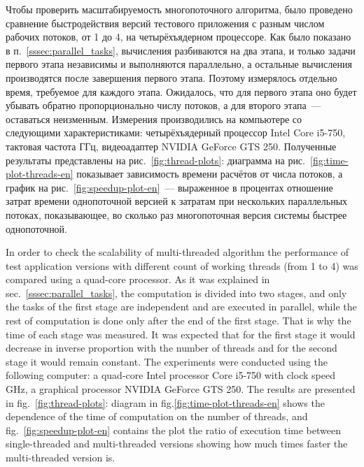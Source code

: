 \documentclass[a4paper, 12pt, titlepage]{extarticle}
\newcommand{\num}[1]{\numprint{#1}}
\begin{document}
\begin{original}
        Чтобы проверить масштабируемость многопоточного алгоритма, было проведено сравнение быстродействия
        версий тестового приложения с разным числом рабочих потоков, от 1 до 4, на четырёхъядерном
        процессоре. Как было показано в п.~\ref{sssec:parallel_tasks}, вычисления разбиваются на два
        этапа, и только задачи первого этапа независимы и выполняются параллельно, а остальные
        вычисления производятся после завершения первого этапа. Поэтому измерялось отдельно время,
        требуемое для каждого этапа. Ожидалось, что для первого этапа оно будет убывать обратно
        пропорционально числу потоков, а для второго этапа~--- оставаться неизменным.
        Измерения производились на компьютере со следующими характеристиками: четырёхъядерный
        процессор Intel Core i5-750, тактовая частота \num{2.66} ГГц, видеоадаптер NVIDIA GeForce GTS 250.
        Полученные результаты представлены на рис.~\ref{fig:thread-plots}: диаграмма на
        рис.~\ref{fig:time-plot-threads-en} показывает зависимость времени расчётов от числа потоков, а
        график на рис.~\ref{fig:speedup-plot-en}~--- выраженное в процентах отношение затрат времени
        однопоточной версией к затратам при нескольких параллельных потоках, показывающее, во сколько раз
        многопоточная версия системы быстрее однопоточной.
\end{original}

        In order to check the scalability of multi-threaded algorithm the performance of test
        application versions with different count of working threads (from 1 to 4) was compared
        using a quad-core processor. As it was explained in sec.~\ref{sssec:parallel_tasks}, the
        computation is divided into two stages, and only the tasks of the first stage are
        independent and are executed in parallel, while the rest of computation is done only after
        the end of the first stage. That is why the time of each stage was measured. It was expected
        that for the first stage it would decrease in inverse proportion with the number of threads
        and for the second stage it would remain constant. The experiments were conducted using the
        following computer: a quad-core Intel processor Core i5-750 with clock speed \num{2.66} GHz,
        a graphical processor NVIDIA GeForce GTS 250. The results are presented in
        fig.~\ref{fig:thread-plots}: diagram in fig.\ref{fig:time-plot-threads-en} shows the dependence
        of the time of computation on the number of threads, and
        fig.~\ref{fig:speedup-plot-en} contains the plot the ratio of execution time between single-threaded and
        multi-threaded versions showing how much times faster the multi-threaded version is.
\end{document}
